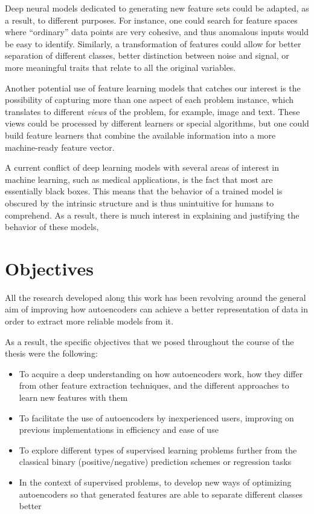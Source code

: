 
Deep neural models dedicated to generating new feature sets could be adapted, as a result, to different purposes. For instance, one could search for feature spaces where ``ordinary'' data points are very cohesive, and thus anomalous inputs would be easy to identify. Similarly, a transformation of features could allow for better separation of different classes, better distinction between noise and signal, or more meaningful traits that relate to all the original variables.


Another potential use of feature learning models that catches our interest is the possibility of capturing more than one aspect of each problem instance, which translates to different \textit{views} of the problem, for example, image and text. These views could be processed by different learners or special algorithms, but one could build feature learners that combine the available information into a more machine-ready feature vector.


A current conflict of deep learning models with several areas of interest in machine learning, such as medical applications, is the fact that most are essentially black boxes. This means that the behavior of a trained model is obscured by the intrinsic structure and is thus unintuitive for humans to comprehend. As a result, there is much interest in explaining and justifying the behavior of these models, 

\section{Objectives}

All the research developed along this work has been revolving around the general aim of improving how autoencoders can achieve a better representation of data in order to extract more reliable models from it. 

As a result, the specific objectives that we posed throughout the course of the thesis were the following:

\begin{itemize}
    \item To acquire a deep understanding on how autoencoders work, how they differ from other feature extraction techniques, and the different approaches to learn new features with them
    \item To facilitate the use of autoencoders by inexperienced users, improving on previous implementations in efficiency and ease of use
    \item To explore different types of supervised learning problems further from the classical binary (positive/negative) prediction schemes or regression tasks
    \item In the context of supervised problems, to develop new ways of optimizing autoencoders so that generated features are able to separate different classes better
\end{itemize}

